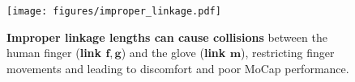 \begin{figure}[ht]
  \centering
  \vspace{2mm}
  \texttt{[image: figures/improper\_linkage.pdf]}
  \caption{
  \textbf{Improper linkage lengths can cause collisions} between the human finger (\textbf{link $\boldsymbol{f, g}$}) and the glove (\textbf{link $\boldsymbol{m}$}), restricting finger movements and leading to discomfort and poor MoCap performance.
  }
  \label{fig:improper_linkage}
  \vspace{-3mm}
\end{figure}